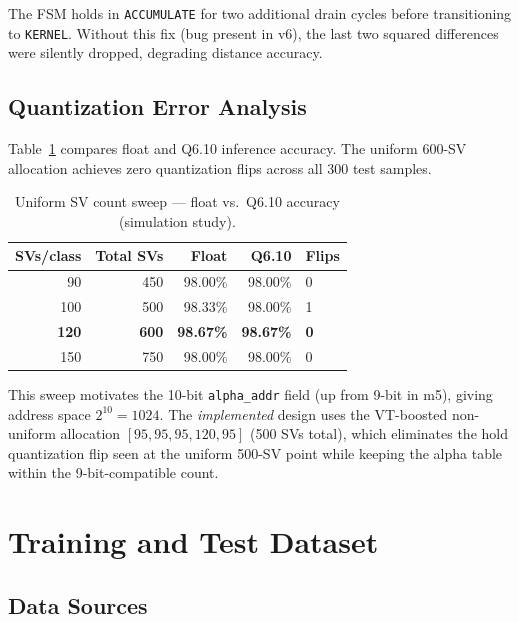 \documentclass[11pt]{article}
\begin{document}
\noindent The FSM holds in \texttt{ACCUMULATE} for two additional drain cycles
before transitioning to \texttt{KERNEL}.  Without this fix (bug present in v6),
the last two squared differences were silently dropped, degrading distance
accuracy.

\subsection{Quantization Error Analysis}

Table~\ref{tab:quant} compares float and Q6.10 inference accuracy.  The uniform
600-SV allocation achieves zero quantization flips across all 300 test samples.

\begin{table}[H]
  \centering
  \caption{Uniform SV count sweep --- float vs.\ Q6.10 accuracy (simulation study).}
  \label{tab:quant}
  \small
  \begin{tabular}{rrrrl}
    \toprule
    SVs/class & Total SVs & Float & Q6.10 & Flips \\
    \midrule
    90  & 450 & 98.00\% & 98.00\% & 0 \\
    100 & 500 & 98.33\% & 98.00\% & 1 \\
    \textbf{120} & \textbf{600} & \textbf{98.67\%} & \textbf{98.67\%} & \textbf{0} \\
    150 & 750 & 98.00\% & 98.00\% & 0 \\
    \bottomrule
  \end{tabular}
\end{table}

This sweep motivates the 10-bit \texttt{alpha\_addr} field (up from 9-bit in m5),
giving address space $2^{10}=1024$.  The \emph{implemented} design uses the
VT-boosted non-uniform allocation $[95,95,95,120,95]$ (500 SVs total), which
eliminates the hold quantization flip seen at the uniform 500-SV point while
keeping the alpha table within the 9-bit-compatible count.

\section{Training and Test Dataset}

\subsection{Data Sources}
\end{document}
